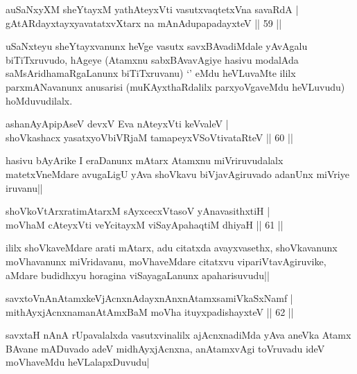 \begin{shl}
auSaNxyXM sheYtayxM yathA\s teyxVti vasutxvaqtetxVna savaRdA |\\
gAtARdayxtayxyavatatxvXtarx na mAnAdupapadayxteV \hfill || 59 ||
\end{shl}

\begin{artha}
uSaNxteyu sheYtayxvanunx heVge vasutx savxBAvadiMdale yAvAgalu biTiTxruvudo, hAgeye (Atamxnu sabxBAvavAgiye hasivu modalAda saMsAridhamaRgaLanunx biTiTxruvanu) `\stext ' eMdu heVLuvaMte ililx parxmANavanunx anusarisi (muKAyxthaRdalilx parxyoVgaveMdu heVLuvudu) hoMduvudilalx. 
\end{artha}

\begin{shl}
ashanAyApipAseV devxV Eva nAteyxVti keVvaleV |\\
shoVkashacx yasatxyoVbiVRjaM tamapeyxVSoV\s tivataRteV \hfill || 60 ||
\end{shl}

\begin{artha}
hasivu bAyArike I eraDanunx mAtarx Atamxnu miVriruvudalalx matetxVneMdare avugaLigU yAva shoVkavu biVjavAgiruvado adanUnx miVriye iruvanu||
\end{artha}


\begin{shl}
shoVkoV\s tArxratimAtarxM sAyxcecxVtasoV yA\s navasithxtiH |\\
moVhaM cAteyxVti veYcitayxM viSayApahaqtiM dhiyaH \hfill || 61 ||
\end{shl}

\begin{artha}%
ililx shoVkaveMdare arati mAtarx, adu citatxda avayxvasethx, shoVkavanunx moVhavanunx miVridavanu, moVhaveMdare citatxvu vipariVtavAgiruvike, aMdare budidhxyu horagina viSayagaLanunx apaharisuvudu||
\end{artha}

\begin{shl}
savxtoV\s nAnAtamxkeV\s jAcnxnAdayxnAnxnAtamxsamiVkaSxNamf |\\
mithAyxjAcnxnamanAtAmxBaM moVha ituyxpadishayxteV \hfill || 62 ||
\end{shl}

\begin{artha}
savxtaH nAnA rUpavalalxda vasutxvinalilx ajAcnxnadiMda yAva aneVka Atamx BAvane mADuvado adeV midhAyxjAcnxna, anAtamxvAgi toVruvadu ideV moVhaveMdu heVLalapxDuvudu|
\end{artha}

